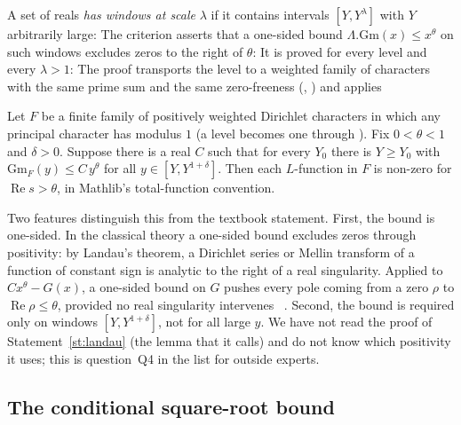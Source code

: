 A set of reals \emph{has windows at scale} $\lambda$ if it contains intervals $[Y,Y^{\lambda}]$ with
$Y$ arbitrarily large:
\noindent The criterion asserts that a one-sided bound $\Lambda.\mathrm{Gm}(x)\le x^{\theta}$ on such
windows excludes zeros to the right of $\theta$:
\noindent It is proved for every level and every $\lambda>1$:
\noindent The proof transports the level to a weighted family of characters with the same prime sum
and the same zero-freeness (,
) and applies

\begin{statement}\label{st:landau}
Let $F$ be a finite family of positively weighted Dirichlet characters in which any principal
character has modulus $1$ (a level becomes one through
). Fix $0<\theta<1$ and $\delta>0$. Suppose there is a
real $C$ such that for every $Y_0$ there is $Y\ge Y_0$ with $\mathrm{Gm}_F(y)\le C\,y^{\theta}$ for
all $y\in[Y,Y^{1+\delta}]$. Then each $L$-function in $F$ is non-zero for
$\operatorname{Re}s>\theta$, in Mathlib's total-function convention.
\end{statement}

Two features distinguish this from the textbook statement. First, the bound is one-sided. In the
classical theory a one-sided bound excludes zeros through positivity: by Landau's theorem, a
Dirichlet series or Mellin transform of a function of constant sign is analytic to the right of a
real singularity. Applied to $C x^{\theta}-G(x)$, a one-sided bound on $G$ pushes every pole coming
from a zero $\rho$ to $\operatorname{Re}\rho\le\theta$, provided no real singularity intervenes
\stcs~\cite[Ch.~1 and~15]{montgomery-vaughan}. Second, the bound is required only on windows
$[Y,Y^{1+\delta}]$, not for all large $y$. We have not read the proof of
Statement~\ref{st:landau} (the lemma  that it calls) and do not know which
positivity it uses; this is question~Q4 in the list for outside experts.

\subsection{The conditional square-root bound}

